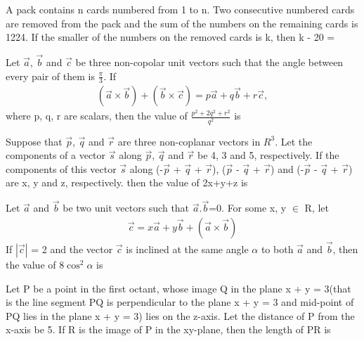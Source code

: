 \item A pack contains n cards numbered from 1 to n. Two consecutive numbered cards are removed from the pack and the sum of the numbers on the remaining cards is 1224. If the smaller of the numbers on the removed cards is k, then k - 20 = 

\item Let $\overrightarrow{a}$, $\overrightarrow{b}$ and $\overrightarrow{c}$ be three non-copolar unit vectors such that the angle between every pair of them is $\frac{\pi}{3}$. If 
\begin{align*}
(\overrightarrow{a} \times \overrightarrow{b}) + (\overrightarrow{b} \times \overrightarrow{c}) = p\overrightarrow{a} + q\overrightarrow{b} + r\overrightarrow{c},
\end{align*}
where p, q, r are scalars, then the value of $\frac{p^{2} + 2q^{2} + r^{2}}{q^{2}}$ is

\item Suppose that $\overrightarrow{p}$, $\overrightarrow{q}$ and $\overrightarrow{r}$ are three non-coplanar vectors in $R^{3}$. Let the components of a vector $\overrightarrow{s}$ along $\overrightarrow{p}$, $\overrightarrow{q}$ and 
$\overrightarrow{r}$ be 4, 3 and 5, respectively. If the components of this vector $\overrightarrow{s}$ along 
(-$\overrightarrow{p}$ + $\overrightarrow{q}$ + $\overrightarrow{r}$), ($\overrightarrow{p}$ - $\overrightarrow{q}$ + $\overrightarrow{r}$) and (-$\overrightarrow{p}$ - $\overrightarrow{q}$ + $\overrightarrow{r}$) are x, y and z, respectively. then the value of 2x+y+z is

\item Let $\overrightarrow{a}$ and $\overrightarrow{b}$ be two unit vectors such that $\overrightarrow{a}$.$\overrightarrow{b}$=0. For some x, y $\in$ R, let 
\begin{align*}
\overrightarrow{c} = x\overrightarrow{a} + y\overrightarrow{b} + (\overrightarrow{a} \times \overrightarrow{b})
\end{align*}
If $|\overrightarrow{c}|$ = 2 and the vector $\overrightarrow{c}$ is inclined at the same angle $\alpha$ to both $\overrightarrow{a}$ and $\overrightarrow{b}$, then the value of 8$\cos^{2}\alpha$ is

\item Let P be a point in the first octant, whose image Q in the plane x + y = 3(that is the line segment PQ is perpendicular to the plane x + y = 3 and mid-point of PQ lies in the plane x + y = 3) lies on the z-axis. Let the distance of P from the x-axis be 5. If R is the image of P in the xy-plane, then the length of PR is

